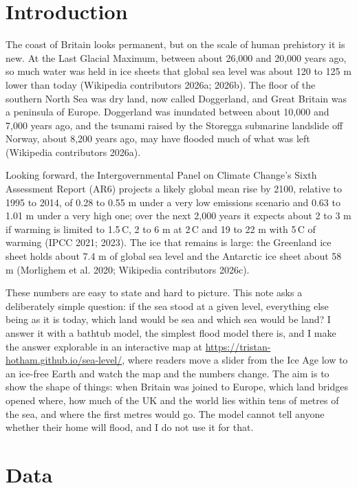 \documentclass[11pt,a4paper]{article}
\begin{document}
\section{Introduction}

The coast of Britain looks permanent, but on the scale of human prehistory it is new. At the Last Glacial Maximum, between about 26,000 and 20,000 years ago, so much water was held in ice sheets that global sea level was about 120 to 125 m lower than today (Wikipedia contributors 2026a; 2026b). The floor of the southern North Sea was dry land, now called Doggerland, and Great Britain was a peninsula of Europe. Doggerland was inundated between about 10,000 and 7,000 years ago, and the tsunami raised by the Storegga submarine landslide off Norway, about 8,200 years ago, may have flooded much of what was left (Wikipedia contributors 2026a).

Looking forward, the Intergovernmental Panel on Climate Change's Sixth Assessment Report (AR6) projects a likely global mean rise by 2100, relative to 1995 to 2014, of 0.28 to 0.55 m under a very low emissions scenario and 0.63 to 1.01 m under a very high one; over the next 2,000 years it expects about 2 to 3 m if warming is limited to 1.5\,\textdegree C, 2 to 6 m at 2\,\textdegree C and 19 to 22 m with 5\,\textdegree C of warming (IPCC 2021; 2023). The ice that remains is large: the Greenland ice sheet holds about 7.4 m of global sea level and the Antarctic ice sheet about 58 m (Morlighem et al. 2020; Wikipedia contributors 2026c).

These numbers are easy to state and hard to picture. This note asks a deliberately simple question: if the sea stood at a given level, everything else being as it is today, which land would be sea and which sea would be land? I answer it with a bathtub model, the simplest flood model there is, and I make the answer explorable in an interactive map at \url{https://tristan-hotham.github.io/sea-level/}, where readers move a slider from the Ice Age low to an ice-free Earth and watch the map and the numbers change. The aim is to show the shape of things: when Britain was joined to Europe, which land bridges opened where, how much of the UK and the world lies within tens of metres of the sea, and where the first metres would go. The model cannot tell anyone whether their home will flood, and I do not use it for that.

\section{Data}
\end{document}
